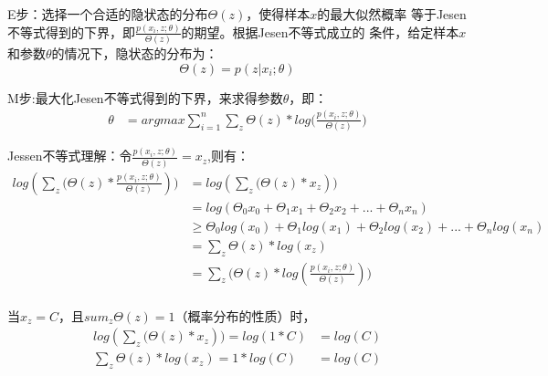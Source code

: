 E步：选择一个合适的隐状态的分布$\Theta(z)$，使得样本$x$的最大似然概率
等于Jesen不等式得到的下界，即$\frac{p(x_i,z;\theta)}{\Theta(z)}$的期望。根据Jesen不等式成立的
条件，给定样本$x$和参数$\theta$的情况下，隐状态的分布为：
\begin{displaymath}
\Theta(z)=p(z|x_i;\theta)
\end{displaymath} 

M步:最大化Jesen不等式得到的下界，来求得参数$\theta$，即：
\begin{displaymath}
\begin{split}
\theta &= argmax{\sum_{i=1}^{n}{\sum_{z}{\Theta(z)*log(\frac{p(x_i,z;\theta)}{\Theta(z)}})}}
\end{split}
\end{displaymath} 

Jessen不等式理解：令$\frac{p(x_i,z;\theta)}{\Theta(z)} = x_z$,则有：
\begin{displaymath}
\begin{split}
log(\sum_{z}{(\Theta(z)*\frac{p(x_i,z;\theta)}{\Theta(z)}})) &=log(\sum_{z}{(\Theta(z)*x_z}))\\
&=log(\Theta_{0}x_0 + \Theta_{1}x_1 +\Theta_{2}x_2+...+\Theta_{n}x_n)\\
&\geq \Theta_0log(x_0) + \Theta_1log(x_1) +\Theta_2log(x_2)+...+\Theta_nlog(x_n)\\
&=\sum_{z}{\Theta(z)*log(x_z)}\\
&=\sum_{z}{(\Theta(z)*log(\frac{p(x_i,z;\theta)}{\Theta(z)})})\\
\end{split}
\end{displaymath} 

当$x_z=C$，且$sum_{z}{\Theta(z)} = 1$（概率分布的性质）时，
\begin{displaymath}
\begin{split}
log(\sum_{z}{(\Theta(z)*x_z})) = log(1*C) &=log(C)\\
\sum_{z}{\Theta(z)*log(x_z)} = 1*log(C)&=log(C)
\end{split}
\end{displaymath} 
